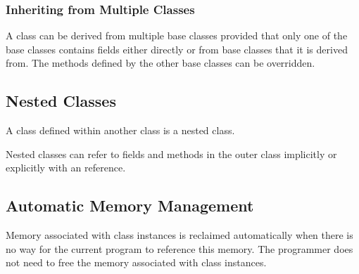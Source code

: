 \subsubsection{Inheriting from Multiple Classes}
\label{Inheriting_from_Multiple_Classes}

A class can be derived from multiple base classes provided that only
one of the base classes contains fields either directly or from base
classes that it is derived from.  The methods defined by the other
base classes can be overridden.

\subsection{Nested Classes}
\label{Nested_Classes}

A class defined within another class is a nested class.

Nested classes can refer to fields and methods in the outer class
implicitly or explicitly with an  reference.

\subsection{Automatic Memory Management}
\label{Automatic_Memory_Management}

Memory associated with class instances is reclaimed automatically when
there is no way for the current program to reference this memory.  The
programmer does not need to free the memory associated with class
instances.
